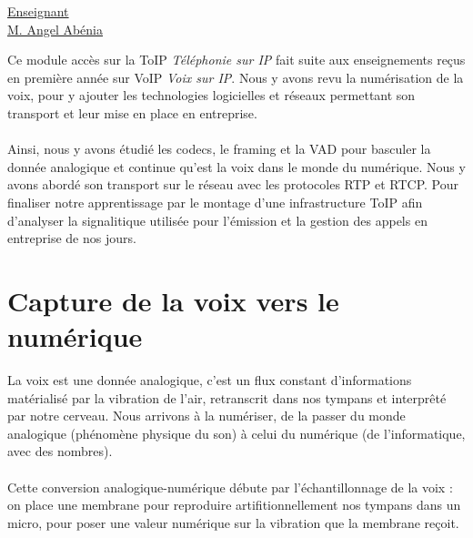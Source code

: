 \renewcommand{\figurename}{}

\vspace*{0.2cm}%
      \large
      \href{}{\color{black}Enseignant\\M. Angel Abénia}\\%
      \normalsize
\vspace*{0.5cm}%

Ce module accès sur la ToIP \textit{Téléphonie sur IP} fait suite aux enseignements reçus en première année sur VoIP \textit{Voix sur IP}. Nous y avons revu la numérisation de la voix, pour y ajouter les technologies logicielles et réseaux permettant son transport et leur mise en place en entreprise.
\\ \\
Ainsi, nous y avons étudié les codecs, le framing et la VAD pour basculer la donnée analogique et continue qu'est la voix dans le monde du numérique. Nous y avons abordé son transport sur le réseau avec les protocoles RTP et RTCP. Pour finaliser notre apprentissage par le montage d'une infrastructure ToIP afin d'analyser la signalitique utilisée pour l'émission et la gestion des appels en entreprise de nos jours.

\section{Capture de la voix vers le numérique}

La voix est une donnée analogique, c'est un flux constant d'informations matérialisé par la vibration de l'air, retranscrit dans nos tympans et interprêté par notre cerveau. Nous arrivons à la numériser, de la passer du monde analogique (phénomène physique du son) à celui du numérique (de l'informatique, avec des nombres).
\\ \\
Cette conversion analogique-numérique débute par l'échantillonnage de la voix : on place une membrane pour reproduire artifitionnellement nos tympans dans un micro, pour poser une valeur numérique sur la vibration que la membrane reçoit.

